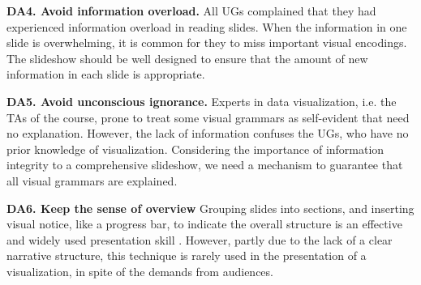 \noindent
\textbf{DA4. Avoid information overload.} 
All UGs complained that they had experienced information overload in reading slides. 
When the information in one slide is overwhelming, it is common for they to miss important visual encodings. 
The slideshow should be well designed to ensure that the amount of new information in each slide is appropriate. 

\noindent
\textbf{DA5. Avoid unconscious ignorance.}
Experts in data visualization, i.e. the TAs of the course, prone to treat some visual grammars as self-evident that need no  explanation. However, the lack of information confuses the UGs, who have no prior knowledge of visualization. 
Considering the importance of information integrity to a comprehensive slideshow, we need a mechanism to guarantee that all visual grammars are explained. 

\noindent
\textbf{DA6. Keep the sense of overview}
Grouping slides into sections, and inserting visual notice, like a progress bar, to indicate the overall structure is an effective and widely used presentation skill . 
However, partly due to the lack of a clear narrative structure, this technique is rarely used in the presentation of a visualization, in spite of the demands from audiences.



